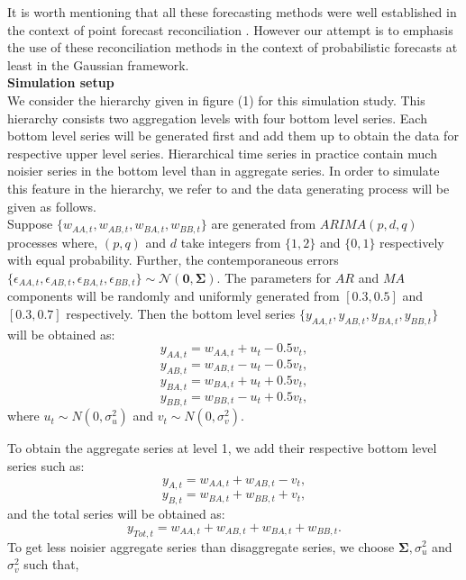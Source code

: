 \documentclass[a4paper, 11pt]{article}
\begin{document}
\noindent
It is worth mentioning that all these forecasting methods were well established in the context of point forecast reconciliation \citep{Hyndman2011, Wickramasuriya2017, Hyndman2016}. However our attempt is to emphasis the use of these reconciliation methods in the context of probabilistic forecasts at least in the Gaussian framework. \\

\noindent
\textbf{Simulation setup}\\

\noindent
We consider the hierarchy given in figure (1) for this simulation study. This hierarchy consists two aggregation levels with four bottom level series. Each bottom level series will be generated first and add them up to obtain the data for respective upper level series. Hierarchical time series in practice contain much noisier series in the bottom level than in aggregate series. In order to simulate this feature in the hierarchy, we refer to \citet{Wickramasuriya2017} and the data generating process will be given as follows. \\

\noindent
Suppose $\{w_{AA,t},w_{AB,t},w_{BA,t},w_{BB,t}\}$ are generated from $ARIMA(p,d,q)$ processes where, $(p,q)$ and $d$ take integers from $\{1,2\}$ and $\{0,1\}$ respectively with equal probability. Further, the contemporaneous errors $\{\epsilon_{AA,t},\epsilon_{AB,t},\epsilon_{BA,t},\epsilon_{BB,t}\} \sim \mathcal{N}(\bm{0}, \bm{\Sigma})$. The parameters for $AR$ and $MA$ components will be randomly and uniformly generated from $[0.3,0.5]$ and $[0.3,0.7]$ respectively. Then the bottom level series $\{y_{AA,t},y_{AB,t},y_{BA,t},y_{BB,t}\}$ will be obtained as: 
$$y_{AA,t} = w_{AA,t} + u_t - 0.5v_t,$$
$$y_{AB,t} = w_{AB,t} - u_t - 0.5v_t,$$
$$y_{BA,t} = w_{BA,t} + u_t + 0.5v_t,$$
$$y_{BB,t} = w_{BB,t} - u_t + 0.5v_t,$$ 
\noindent
where $u_t \sim N(0,\sigma^2_u)$ and $v_t \sim N(0,\sigma^2_v)$. 

\noindent
To obtain the aggregate series at level 1, we add their respective bottom level series such as: 
$$y_{A,t} = w_{AA,t} + w_{AB,t} - v_t,$$
$$y_{B,t} = w_{BA,t} + w_{BB,t} + v_t,$$
\noindent
and the total series will be obtained as: 
$$y_{Tot,t} = w_{AA,t} + w_{AB,t} + w_{BA,t} + w_{BB,t}.$$
\noindent
To get less noisier aggregate series than disaggregate series, we choose $\bm{\Sigma}, \sigma^2_u$ and $\sigma^2_v$ such that, 
\end{document}
